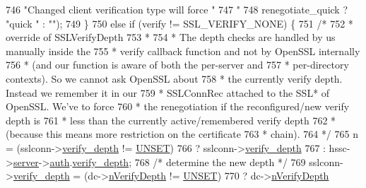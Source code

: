 \begin{DoxyCode}
{746                               \textcolor{stringliteral}{"Changed client verification type will force "}
747                               \textcolor{stringliteral}{"%
748                               renegotiate\_quick ? \textcolor{stringliteral}{"quick "} : \textcolor{stringliteral}{""});
749             \}
750             \textcolor{keywordflow}{else} \textcolor{keywordflow}{if} (verify != SSL\_VERIFY\_NONE) \{
751                 \textcolor{comment}{/*}
752 \textcolor{comment}{                 * override of SSLVerifyDepth}
753 \textcolor{comment}{                 *}
754 \textcolor{comment}{                 * The depth checks are handled by us manually inside the}
755 \textcolor{comment}{                 * verify callback function and not by OpenSSL internally}
756 \textcolor{comment}{                 * (and our function is aware of both the per-server and}
757 \textcolor{comment}{                 * per-directory contexts). So we cannot ask OpenSSL about}
758 \textcolor{comment}{                 * the currently verify depth. Instead we remember it in our}
759 \textcolor{comment}{                 * SSLConnRec attached to the SSL* of OpenSSL.  We've to force}
760 \textcolor{comment}{                 * the renegotiation if the reconfigured/new verify depth is}
761 \textcolor{comment}{                 * less than the currently active/remembered verify depth}
762 \textcolor{comment}{                 * (because this means more restriction on the certificate}
763 \textcolor{comment}{                 * chain).}
764 \textcolor{comment}{                 */}
765                 n = (sslconn->\hyperlink{structSSLConnRec_a72fc657db836b8eb8d66919de3ff2300}{verify\_depth} != \hyperlink{mod__authz__core_8c_ab0b265b69299aeccfade9365cf04db2a}{UNSET})
766                     ? sslconn->\hyperlink{structSSLConnRec_a72fc657db836b8eb8d66919de3ff2300}{verify\_depth}
767                     : hssc->\hyperlink{structSSLSrvConfigRec_a7941dbc2f9fa504b3968a4afdc4b96fc}{server}->\hyperlink{structmodssl__ctx__t_a55144723f90510fb094554f7652f0ef0}{auth}.\hyperlink{structmodssl__auth__ctx__t_ab1486d9b2a656743afb44f3fc70401d5}{verify\_depth};
768                 \textcolor{comment}{/* determine the new depth */}
769                 sslconn->\hyperlink{structSSLConnRec_a72fc657db836b8eb8d66919de3ff2300}{verify\_depth} = (dc->\hyperlink{structSSLDirConfigRec_ab3ebb05dce625ae0144232bed6b02dfe}{nVerifyDepth} != 
      \hyperlink{mod__authz__core_8c_ab0b265b69299aeccfade9365cf04db2a}{UNSET})
770                                         ? dc->\hyperlink{structSSLDirConfigRec_ab3ebb05dce625ae0144232bed6b02dfe}{nVerifyDepth}
}}
\end{DoxyCode}
